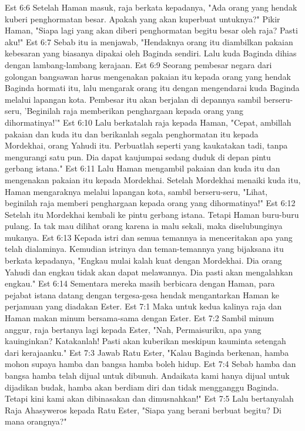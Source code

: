 Est 6:6  Setelah Haman masuk, raja berkata kepadanya, "Ada orang yang hendak kuberi penghormatan besar. Apakah yang akan kuperbuat untuknya?" Pikir Haman, "Siapa lagi yang akan diberi penghormatan begitu besar oleh raja? Pasti aku!"
Est 6:7  Sebab itu ia menjawab, "Hendaknya orang itu diambilkan pakaian kebesaran yang biasanya dipakai oleh Baginda sendiri. Lalu kuda Baginda dihias dengan lambang-lambang kerajaan.
Est 6:9  Seorang pembesar negara dari golongan bangsawan harus mengenakan pakaian itu kepada orang yang hendak Baginda hormati itu, lalu mengarak orang itu dengan mengendarai kuda Baginda melalui lapangan kota. Pembesar itu akan berjalan di depannya sambil berseru-seru, 'Beginilah raja memberikan penghargaan kepada orang yang dihormatinya!'"
Est 6:10  Lalu berkatalah raja kepada Haman, "Cepat, ambillah pakaian dan kuda itu dan berikanlah segala penghormatan itu kepada Mordekhai, orang Yahudi itu. Perbuatlah seperti yang kaukatakan tadi, tanpa mengurangi satu pun. Dia dapat kaujumpai sedang duduk di depan pintu gerbang istana."
Est 6:11  Lalu Haman mengambil pakaian dan kuda itu dan mengenakan pakaian itu kepada Mordekhai. Setelah Mordekhai menaiki kuda itu, Haman mengaraknya melalui lapangan kota, sambil berseru-seru, "Lihat, beginilah raja memberi penghargaan kepada orang yang dihormatinya!"
Est 6:12  Setelah itu Mordekhai kembali ke pintu gerbang istana. Tetapi Haman buru-buru pulang. Ia tak mau dilihat orang karena ia malu sekali, maka diselubunginya mukanya.
Est 6:13  Kepada istri dan semua temannya ia menceritakan apa yang telah dialaminya. Kemudian istrinya dan teman-temannya yang bijaksana itu berkata kepadanya, "Engkau mulai kalah kuat dengan Mordekhai. Dia orang Yahudi dan engkau tidak akan dapat melawannya. Dia pasti akan mengalahkan engkau."
Est 6:14  Sementara mereka masih berbicara dengan Haman, para pejabat istana datang dengan tergesa-gesa hendak mengantarkan Haman ke perjamuan yang diadakan Ester.
Est 7:1  Maka untuk kedua kalinya raja dan Haman makan minum bersama-sama dengan Ester.
Est 7:2  Sambil minum anggur, raja bertanya lagi kepada Ester, "Nah, Permaisuriku, apa yang kauinginkan? Katakanlah! Pasti akan kuberikan meskipun kauminta setengah dari kerajaanku."
Est 7:3  Jawab Ratu Ester, "Kalau Baginda berkenan, hamba mohon supaya hamba dan bangsa hamba boleh hidup.
Est 7:4  Sebab hamba dan bangsa hamba telah dijual untuk dibunuh. Andaikata kami hanya dijual untuk dijadikan budak, hamba akan berdiam diri dan tidak mengganggu Baginda. Tetapi kini kami akan dibinasakan dan dimusnahkan!"
Est 7:5  Lalu bertanyalah Raja Ahasyweros kepada Ratu Ester, "Siapa yang berani berbuat begitu? Di mana orangnya?"
